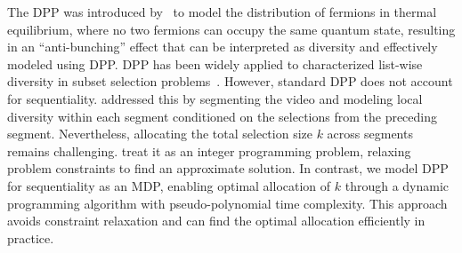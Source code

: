 The DPP was introduced by~\citet{macchi1975coincidence} to model the distribution of fermions in thermal equilibrium, where no two fermions can occupy the same quantum state, resulting in an ``anti-bunching'' effect that can be interpreted as diversity and effectively modeled using DPP. 
DPP has been widely applied to characterized list-wise diversity in subset selection problems~\cite{kulesza2012determinantal,moss2023inducing,celis2018fair,li2024evaluation,chen2018fast}. 
However, standard DPP does not account for sequentiality. 
\citet{gong2014diverse} addressed this by segmenting the video and modeling local diversity within each segment conditioned on the selections from the preceding segment.
%
Nevertheless, allocating the total selection size \(k\) across segments remains challenging.
\citet{zheng2021k} treat it as an integer programming problem, relaxing problem constraints to find an approximate solution.
In contrast, we model DPP for sequentiality as an MDP, enabling optimal allocation of \(k\) through a dynamic programming algorithm with pseudo-polynomial time complexity. 
This approach avoids constraint relaxation and can find the optimal allocation efficiently in practice.



